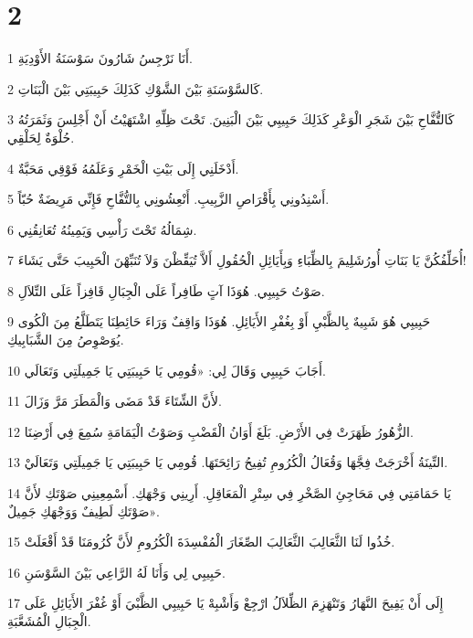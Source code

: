 \chapter{2}

\par 1 أَنَا نَرْجِسُ شَارُونَ سَوْسَنَةُ الأَوْدِيَةِ.
\par 2 كَالسَّوْسَنَةِ بَيْنَ الشَّوْكِ كَذَلِكَ حَبِيبَتِي بَيْنَ الْبَنَاتِ.
\par 3 كَالتُّفَّاحِ بَيْنَ شَجَرِ الْوَعْرِ كَذَلِكَ حَبِيبِي بَيْنَ الْبَنِينَ. تَحْتَ ظِلِّهِ اشْتَهَيْتُ أَنْ أَجْلِسَ وَثَمَرَتُهُ حُلْوَةٌ لِحَلْقِي.
\par 4 أَدْخَلَنِي إِلَى بَيْتِ الْخَمْرِ وَعَلَمُهُ فَوْقِي مَحَبَّةٌ.
\par 5 أَسْنِدُونِي بِأَقْرَاصِ الزَّبِيبِ. أَنْعِشُونِي بِالتُّفَّاحِ فَإِنِّي مَرِيضَةٌ حُبّاً.
\par 6 شِمَالُهُ تَحْتَ رَأْسِي وَيَمِينُهُ تُعَانِقُنِي.
\par 7 أُحَلِّفُكُنَّ يَا بَنَاتِ أُورُشَلِيمَ بِالظِّبَاءِ وَبِأَيَائِلِ الْحُقُولِ أَلاَّ تُيَقِّظْنَ وَلاَ تُنَبِّهْنَ الْحَبِيبَ حَتَّى يَشَاءَ!
\par 8 صَوْتُ حَبِيبِي. هُوَذَا آتٍ طَافِراً عَلَى الْجِبَالِ قَافِزاً عَلَى التِّلاَلِ.
\par 9 حَبِيبِي هُوَ شَبِيهٌ بِالظَّبْيِ أَوْ بِغُفْرِ الأَيَائِلِ. هُوَذَا وَاقِفٌ وَرَاءَ حَائِطِنَا يَتَطَلَّعُ مِنَ الْكُوى يُوَصْوِصُ مِنَ الشَّبَابِيكِ.
\par 10 أَجَابَ حَبِيبِي وَقَالَ لِي: «قُومِي يَا حَبِيبَتِي يَا جَمِيلَتِي وَتَعَالَي.
\par 11 لأَنَّ الشِّتَاءَ قَدْ مَضَى وَالْمَطَرَ مَرَّ وَزَالَ.
\par 12 الزُّهُورُ ظَهَرَتْ فِي الأَرْضِ. بَلَغَ أَوَانُ الْقَضْبِ وَصَوْتُ الْيَمَامَةِ سُمِعَ فِي أَرْضِنَا.
\par 13 التِّينَةُ أَخْرَجَتْ فِجَّهَا وَقُعَالُ الْكُرُومِ تُفِيحُ رَائِحَتَهَا. قُومِي يَا حَبِيبَتِي يَا جَمِيلَتِي وَتَعَالَيْ.
\par 14 يَا حَمَامَتِي فِي مَحَاجِئِ الصَّخْرِ فِي سِتْرِ الْمَعَاقِلِ. أَرِينِي وَجْهَكِ. أَسْمِعِينِي صَوْتَكِ لأَنَّ صَوْتَكِ لَطِيفٌ وَوَجْهَكِ جَمِيلٌ».
\par 15 خُذُوا لَنَا الثَّعَالِبَ الثَّعَالِبَ الصِّغَارَ الْمُفْسِدَةَ الْكُرُومِ لأَنَّ كُرُومَنَا قَدْ أَقْعَلَتْ.
\par 16 حَبِيبِي لِي وَأَنَا لَهُ الرَّاعِي بَيْنَ السَّوْسَنِ.
\par 17 إِلَى أَنْ يَفِيحَ النَّهَارُ وَتَنْهَزِمَ الظِّلاَلُ ارْجِعْ وَأَشْبِهْ يَا حَبِيبِي الظَّبْيَ أَوْ غُفْرَ الأَيَائِلِ عَلَى الْجِبَالِ الْمُشَعَّبَةِ.

